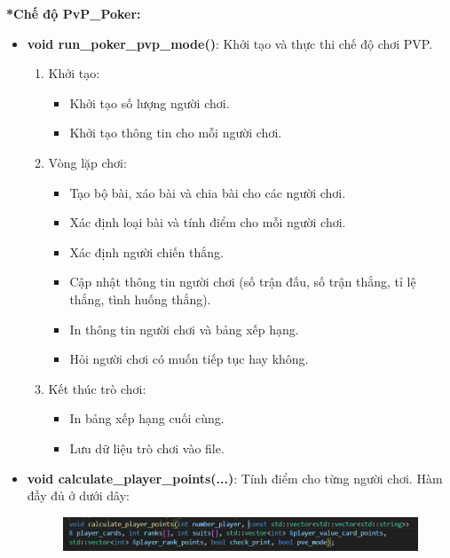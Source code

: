\documentclass{article}
\begin{document}
\vspace{1cm}

\textbf{\fontsize{17pt}{0pt} *Chế độ PvP\_Poker:}

\begin{itemize}
    \item \textbf{void run\_poker\_pvp\_mode()}: Khởi tạo và thực thi chế độ chơi PVP.
    \begin{description}
            \begin{enumerate}
            \item Khởi tạo:
                \begin{itemize}
                    \item Khởi tạo số lượng người chơi.
                    \item Khởi tạo thông tin cho mỗi người chơi.
                \end{itemize}
            \item Vòng lặp chơi:
                \begin{itemize}
                    \item Tạo bộ bài, xáo bài và chia bài cho các người chơi.
                    \item Xác định loại bài và tính điểm cho mỗi người chơi.
                    \item Xác định người chiến thắng.
                    \item Cập nhật thông tin người chơi (số trận đấu, số trận thắng, tỉ lệ thắng, tình huống thắng).
                    \item In thông tin người chơi và bảng xếp hạng.
                    \item Hỏi người chơi có muốn tiếp tục hay không.
                \end{itemize}
            \item Kết thúc trò chơi:
                \begin{itemize}
                    \item In bảng xếp hạng cuối cùng.
                    \item Lưu dữ liệu trò chơi vào file.
                \end{itemize}
        \end{enumerate}
    \end{description}
    
    \item \textbf{void calculate\_player\_points(...)}: Tính điểm cho từng người chơi. Hàm đầy đủ ở dưới dây:
    \begin{figure}[h!]
        \centering 
        \includegraphics[width=1\textwidth]{images/screenshot/calc_player.png}
    \end{figure}


\end{itemize}
\end{document}
